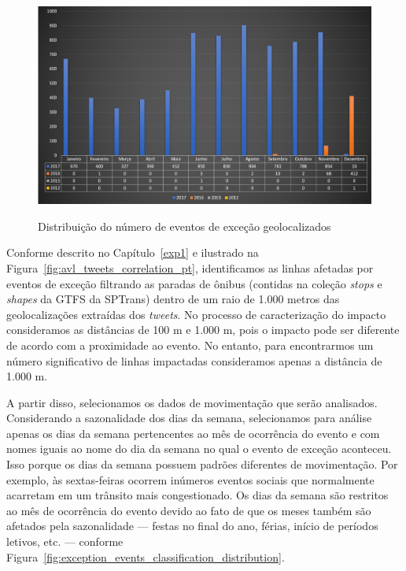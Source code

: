 \documentclass[
	12pt,				%
	oneside,			%
	a4paper,			%
	english,			%
	brazil				%
	]{abntex2ppgsi}
\begin{document}
{{{\begin{figure}[!htb]
	\centering
 	  \caption{Distribuição do número de eventos de exceção geolocalizados}
		\includegraphics[width=1\linewidth]{images/geolocated_exception_events_distribution_pt.png}
	\label{fig:geolocated_exception_events_distribution}
\end{figure}

Conforme descrito no Capítulo~\ref{exp1} e ilustrado na Figura~\ref{fig:avl_tweets_correlation_pt}, identificamos as linhas afetadas por eventos de exceção filtrando as paradas de ônibus (contidas na coleção \textit{stops}  e \textit{shapes} da GTFS da SPTrans) dentro de um raio de 1.000 metros das geolocalizações extraídas dos \textit{tweets}. No processo de caracterização do impacto consideramos as distâncias de 100 m e 1.000 m, pois o impacto pode ser diferente de acordo com a proximidade ao evento. No entanto, para encontrarmos um número significativo de linhas impactadas consideramos apenas a distância de 1.000 m.

A partir disso, selecionamos os dados de movimentação que serão analisados. Considerando a sazonalidade dos dias da semana, selecionamos para análise apenas os dias da semana pertencentes ao mês de ocorrência do evento e com nomes iguais ao nome do dia da semana no qual o evento de exceção aconteceu. Isso porque os dias da semana possuem padrões diferentes de movimentação. Por exemplo, às sextas-feiras ocorrem inúmeros eventos sociais que normalmente acarretam em um trânsito mais congestionado. Os dias da semana são restritos ao mês de ocorrência do evento devido ao fato de que os meses também são afetados pela sazonalidade --- festas no final do ano, férias, início de períodos letivos, etc. --- conforme Figura~\ref{fig:exception_events_classification_distribution}.

}}}
\end{document}
